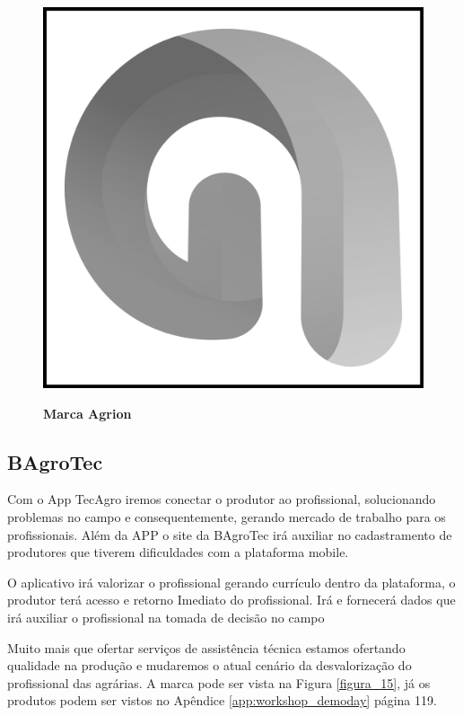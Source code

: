 \begin{figure}[H]
\centering
\caption{\textbf{Marca Agrion}}
\includegraphics[scale=0.07]{Imagens/agrion.png}
\label{figura_14}
\end{figure}

\subsection{BAgroTec}

Com o App TecAgro iremos conectar o produtor ao profissional, solucionando problemas no campo e consequentemente, gerando mercado de trabalho para os profissionais. Além da APP o site da BAgroTec irá auxiliar no cadastramento de produtores que tiverem dificuldades com a plataforma mobile.

O aplicativo irá valorizar o profissional gerando currículo dentro da plataforma, o produtor terá acesso e retorno Imediato do profissional. Irá e fornecerá dados que irá auxiliar o profissional na tomada de decisão no campo

Muito mais que ofertar serviços de assistência técnica estamos ofertando qualidade na produção e mudaremos o atual cenário da desvalorização do profissional das agrárias. A marca pode ser vista na Figura \ref{figura_15}, já os produtos podem ser vistos no Apêndice \ref{app:workshop_demoday} página 119.

